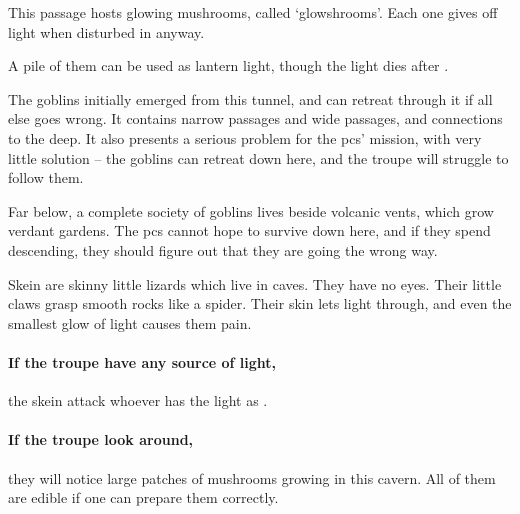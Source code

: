 \begin{multicols}{2}



This passage hosts glowing mushrooms, called `\glspl{glowshroom}'.
Each one gives off light when disturbed in anyway.

A pile of them can be used as lantern light, though the light dies after .




The goblins initially emerged from this tunnel, and can retreat through it if all else goes wrong.
It contains narrow passages and wide passages, and connections to the \gls{deep}.
It also presents a serious problem for the \glspl{pc}' mission, with very little solution -- the goblins can retreat down here, and the troupe will struggle to follow them.

Far below, a complete society of goblins lives beside volcanic vents, which grow verdant gardens.
The \glspl{pc} cannot hope to survive down here, and if they spend  descending, they should figure out that they are going the wrong way.


\begin{exampletext}
  Skein are skinny little lizards which live in caves.
  They have no eyes.
  Their little claws grasp smooth rocks like a spider.
  Their skin lets light through, and even the smallest glow of light causes them pain.
\end{exampletext}

\paragraph{If the troupe have any source of light,}
the skein attack whoever has the light as .

\skeinSwarm

\paragraph{If the troupe look around,}
they will notice large patches of mushrooms growing in this cavern.
All of them are edible if one can prepare them correctly.


\end{multicols}

